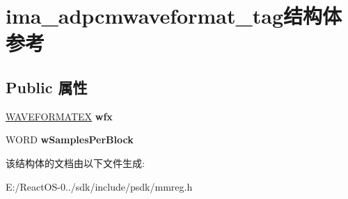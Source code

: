 \hypertarget{structima__adpcmwaveformat__tag}{}\section{ima\+\_\+adpcmwaveformat\+\_\+tag结构体 参考}
\label{structima__adpcmwaveformat__tag}
\subsection*{Public 属性}
\begin{DoxyCompactItemize}
\item 
\mbox{\label{structima__adpcmwaveformat__tag_afdbc781f38e4307b3b6da2b4c3934f87}} 
\hyperlink{struct_w_a_v_e_f_o_r_m_a_t_e_x}{W\+A\+V\+E\+F\+O\+R\+M\+A\+T\+EX} {\bfseries wfx}
\item 
\mbox{\label{structima__adpcmwaveformat__tag_a0136e2aa65303e6a1ab37a69a800b0f4}} 
W\+O\+RD {\bfseries w\+Samples\+Per\+Block}
\end{DoxyCompactItemize}


该结构体的文档由以下文件生成\+:\begin{DoxyCompactItemize}
\item 
E\+:/\+React\+O\+S-\/0../sdk/include/psdk/mmreg.\+h\end{DoxyCompactItemize}
